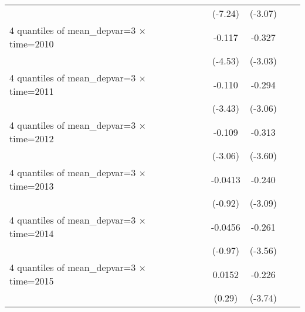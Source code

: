\begin{table}[htbp]
\begin{tabular}{l*{6}{c}}
                    &                     &                     &     (-7.24)         &     (-3.07)         &                     &                     \\
[1em]
4 quantiles of mean\_depvar=3 $\times$ time=2010&                     &                     &      -0.117\sym{***}&      -0.327\sym{***}&                     &                     \\
                    &                     &                     &     (-4.53)         &     (-3.03)         &                     &                     \\
[1em]
4 quantiles of mean\_depvar=3 $\times$ time=2011&                     &                     &      -0.110\sym{***}&      -0.294\sym{***}&                     &                     \\
                    &                     &                     &     (-3.43)         &     (-3.06)         &                     &                     \\
[1em]
4 quantiles of mean\_depvar=3 $\times$ time=2012&                     &                     &      -0.109\sym{***}&      -0.313\sym{***}&                     &                     \\
                    &                     &                     &     (-3.06)         &     (-3.60)         &                     &                     \\
[1em]
4 quantiles of mean\_depvar=3 $\times$ time=2013&                     &                     &     -0.0413         &      -0.240\sym{***}&                     &                     \\
                    &                     &                     &     (-0.92)         &     (-3.09)         &                     &                     \\
[1em]
4 quantiles of mean\_depvar=3 $\times$ time=2014&                     &                     &     -0.0456         &      -0.261\sym{***}&                     &                     \\
                    &                     &                     &     (-0.97)         &     (-3.56)         &                     &                     \\
[1em]
4 quantiles of mean\_depvar=3 $\times$ time=2015&                     &                     &      0.0152         &      -0.226\sym{***}&                     &                     \\
                    &                     &                     &      (0.29)         &     (-3.74)         &                     &                     \\

\end{tabular}
\end{table}
